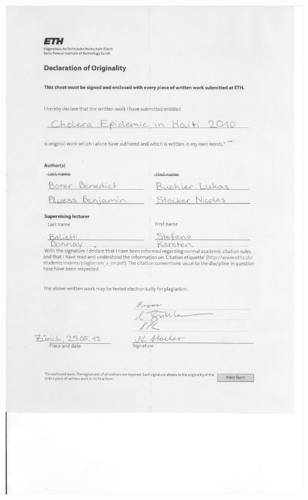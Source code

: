 \documentclass[11pt]{article}
\begin{document}
\newpage
\begin{figure}
\begin{center}


\includegraphics[scale=.6]{Bilder/declaration_of_originality.png}
\end{center}
\end{figure}

\newpage

\tableofcontents

\newpage

\end{document}
